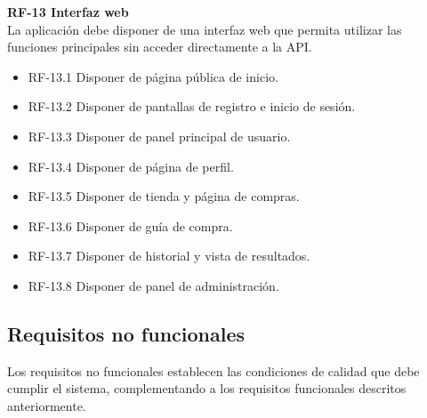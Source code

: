 \textbf{RF-13 Interfaz web}\\
La aplicación debe disponer de una interfaz web que permita utilizar las funciones principales sin acceder directamente a la API.

\begin{itemize}
	\item RF-13.1 Disponer de página pública de inicio.
	\item RF-13.2 Disponer de pantallas de registro e inicio de sesión.
	\item RF-13.3 Disponer de panel principal de usuario.
	\item RF-13.4 Disponer de página de perfil.
	\item RF-13.5 Disponer de tienda y página de compras.
	\item RF-13.6 Disponer de guía de compra.
	\item RF-13.7 Disponer de historial y vista de resultados.
	\item RF-13.8 Disponer de panel de administración.
\end{itemize}

\subsection{Requisitos no funcionales}

Los requisitos no funcionales establecen las condiciones de calidad que debe cumplir el sistema, complementando a los requisitos funcionales descritos anteriormente.

